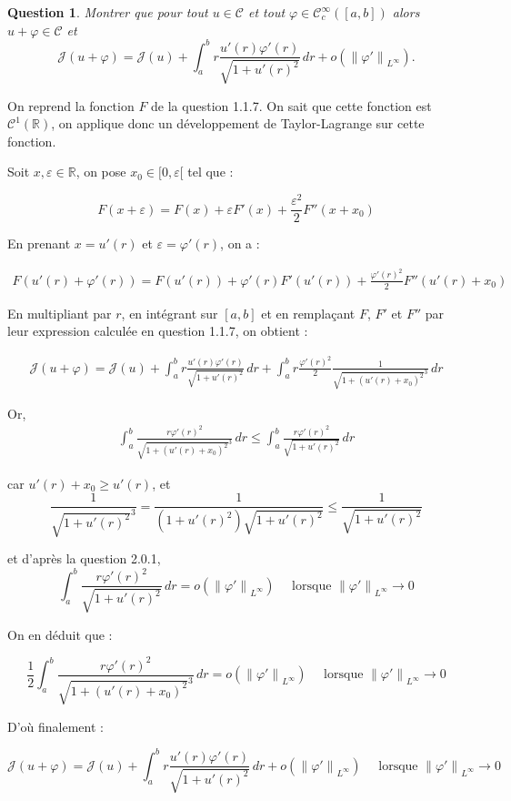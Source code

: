\documentclass{article}
\newcommand{\Real}{ \mathbb{R} }
\newcommand{\FunctionClass}[2]{ \mathcal{C}^{#1} \left( #2 \right) }
\newcommand{\FunctionClassCompact}[2]{ \mathcal{C}_c^{#1} \left( #2 \right) }
\newcommand{\FunctionWithSqrt}[1]{ \sqrt{1 + #1 ^2} }
\newcommand{\Norm}[2]{ \left\| #1 \right\|_{#2} }
\newcommand{\Integral}[4]{ \int_{#1}^{#2} #3 \, d#4 }
\newtheorem{question}{Question}[subsection]
\newenvironment{answer}
  {\color{blue}}
  {}
\newcommand{\QuestionAnswer}[2]{
    \begin{question}
        #1
    \end{question}
    \begin{answer}
        #2
    \end{answer}
}
\newcommand{\SetC}{\mathcal{C}}
\newcommand{\FunctionJ}{\mathcal{J}}
\begin{document}
\QuestionAnswer{
    Montrer que pour tout $u \in \SetC$ et tout $\varphi \in \FunctionClassCompact{\infty}{[a, b]}$ alors $u + \varphi \in \SetC$ et
    $$\FunctionJ(u + \varphi) = \FunctionJ(u) + \Integral{a}{b}{ r \frac{u'(r)\varphi'(r)}{\FunctionWithSqrt{u'(r)}} }{r} + o(\Norm{\varphi'}{L^{\infty}}).$$
}{
    On reprend la fonction $F$ de la question 1.1.7. On sait que cette fonction est $\FunctionClass{1}{\Real}$, on applique donc un développement de Taylor-Lagrange sur cette fonction.\newline

    Soit $x, \varepsilon \in \Real$, on pose $x_0 \in [0, \varepsilon [$ tel que :

    \begin{equation}
        F(x+\varepsilon) = F(x) + \varepsilon F'(x) + \frac{\varepsilon^2}{2}F''(x + x_0)
    \end{equation}

    En prenant $x = u'(r)$ et $\varepsilon = \varphi'(r)$, on a :

    \begin{align*}
        F(u'(r)+\varphi'(r)) = F(u'(r)) + \varphi'(r) F'(u'(r)) + \frac{\varphi'(r)^2}{2}F''(u'(r) + x_0)
    \end{align*}

    En multipliant par $r$, en intégrant sur $[a,b]$ et en remplaçant $F$, $F'$ et $F''$ par leur expression calculée en question 1.1.7, on obtient :
    
    \begin{align*}
        \FunctionJ(u + \varphi) = \FunctionJ(u) + \Integral{a}{b}{ r \frac{u'(r)\varphi'(r)}{\FunctionWithSqrt{u'(r)}} }{r} + 
        \Integral{a}{b}{r \frac{\varphi'(r)^2}{2} \frac{1}{\FunctionWithSqrt{(u'(r) + x_0)}^3} }{r}
    \end{align*}

    Or, 
    \begin{align*}
        \Integral{a}{b}{ \frac{r \varphi'(r)^2}{\FunctionWithSqrt{(u'(r) + x_0)}^3} }{r} \leq \Integral{a}{b}{ \frac{r \varphi'(r)^2}{\FunctionWithSqrt{u'(r)}} }{r}
    \end{align*}

    car $u'(r) + x_0 \geq u'(r)$, et 
    $$\frac{1}{\FunctionWithSqrt{u'(r)}^3} = \frac{1}{(1 + u'(r)^2)\FunctionWithSqrt{u'(r)} } \leq \frac{1}{\FunctionWithSqrt{u'(r)}}$$

    et d'après la question 2.0.1, $$\Integral{a}{b}{ \frac{r \varphi'(r)^2}{\FunctionWithSqrt{u'(r)}} }{r} = o(\Norm{\varphi'}{L^{\infty}}) \quad \text{ lorsque } \Norm{\varphi'}{L^{\infty}} \to 0$$

    On en déduit que :

    $$ \frac{1}{2}\Integral{a}{b}{ \frac{r \varphi'(r)^2}{\FunctionWithSqrt{(u'(r) + x_0)}^3} }{r} = o(\Norm{\varphi'}{L^{\infty}}) \quad \text{ lorsque } \Norm{\varphi'}{L^{\infty}} \to 0$$

    D'où finalement :

    $$\FunctionJ(u + \varphi) = \FunctionJ(u) + \Integral{a}{b}{ r \frac{u'(r)\varphi'(r)}{\FunctionWithSqrt{u'(r)}} }{r} + o(\Norm{\varphi'}{L^{\infty}}) \quad \text{ lorsque } \Norm{\varphi'}{L^{\infty}} \to 0$$
    
}
\end{document}

